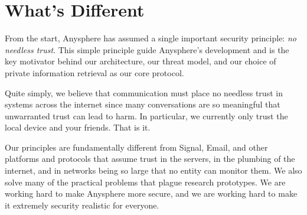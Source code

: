 \section{What's Different}

From the start, Anysphere has assumed a single important security principle: \textit{no needless trust}. This simple principle guide Anysphere's development and is the key motivator behind our architecture, our threat model, and our choice of private information retrieval as our core protocol. 

Quite simply, we believe that communication must place no needless trust in systems across the internet since many conversations are so meaningful that unwarranted trust can lead to harm. In particular, we currently only trust the local device and your friends. That is it.

Our principles are fundamentally different from Signal, Email, and other platforms and protocols that assume trust in the servers, in the plumbing of the internet, and in networks being so large that no entity can monitor them. We also solve many of the practical problems that plague research prototypes. We are working hard to make Anysphere more secure, and we are working hard to make it extremely security realistic for everyone.